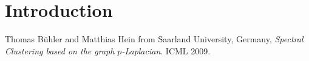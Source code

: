 \documentclass{article}
\begin{document}
\newpage
\tableofcontents
\newpage

\section{Introduction}



\newpage

\begin{thebibliography}{9}

 Thomas Bühler and Matthias Hein from Saarland University, Germany, \textit{Spectral Clustering based on the graph $p$-Laplacian}. ICML 2009.

\end{thebibliography}
\end{document}
